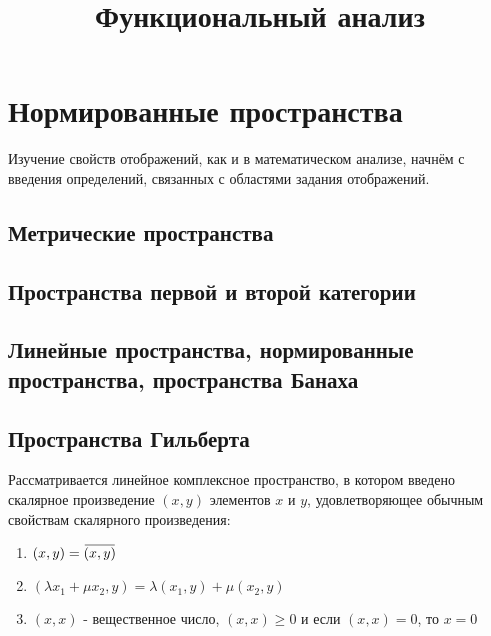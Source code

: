 \documentclass[12pt,a4paper,titlepage]{book}
\title{Функциональный анализ}
\newcommand{\overbar}[1]{\mkern 1.5mu\overline{\mkern-1.5mu#1\mkern-1.5mu}\mkern 1.5mu}
\theoremstyle{definition}
\theoremstyle{plain}
\theoremstyle{remark}
\theoremstyle{plain}
\begin{document}
\chapter{Нормированные пространства}

Изучение свойств отображений, как и в математическом анализе, начнём с введения определений, связанных с областями задания отображений.\\

\section{Метрические пространства}

\section{Пространства первой и второй категории}

\section{Линейные пространства, нормированные пространства, пространства Банаха}

\section{Пространства Гильберта}

Рассматривается линейное комплексное пространство, в котором введено скалярное произведение $(x, y)$ элементов $x$ и $y$, удовлетворяющее обычным свойствам скалярного произведения:

\begin{enumerate}

    \item $(x, y) = \overbar{(x, y)}$

    \item $(\lambda x_1 + \mu x_2, y) = \lambda (x_1, y) + \mu (x_2, y)$

    \item $(x, x)$ - вещественное число, $(x, x) \geqslant 0$ и если $(x, x) = 0$, то $x = 0$

\end{enumerate}
\end{document}
